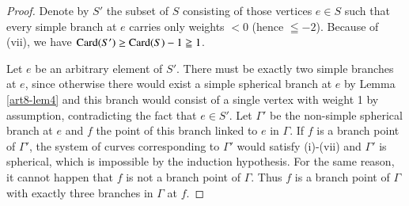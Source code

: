 \begin{proof}
Denote by $S'$ the subset of $S$ consisting of those vertices $e \in S$ such  that every simple branch at $e$ carries only weights $<0$ (hence $\leqq -2$). Because of (vii), we have $\operatorname{Card} (S')\geq \operatorname{Card} (S) -1 \geqq 1$.

Let $e$ be an arbitrary element of $S'$. There must be exactly two simple branches at $e$, since otherwise there would exist a simple spherical branch at $e$ by Lemma \ref{art8-lem4} and this branch would consist of a single vertex with weight 1 by assumption, contradicting the fact that $e \in S'$. Let $\Gamma'$ be the non-simple spherical branch at $e$ and $f$ the point of this branch linked to $e$ in $\Gamma$. If $f$ is a branch point of $\Gamma'$, the system of curves corresponding to $\Gamma'$ would satisfy (i)-(vii) and $\Gamma'$ is spherical, which is impossible by the induction hypothesis. For the same reason, it cannot happen that $f$ is not a branch point of $\Gamma$. Thus $f$ is a branch point of $\Gamma$ with exactly three branches in $\Gamma$ at $f$.


\end{proof}
